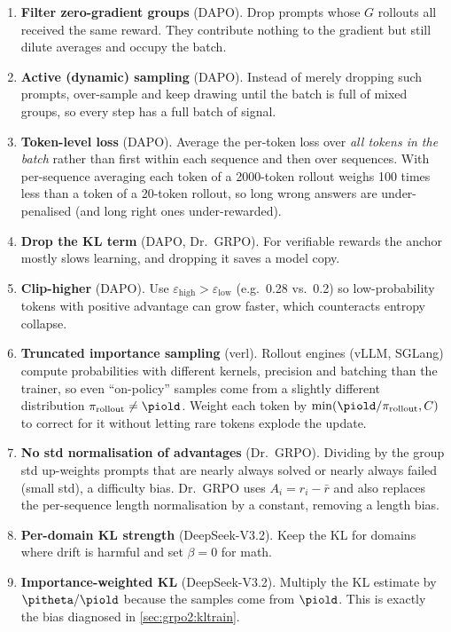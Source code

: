 \begin{enumerate}
\item \textbf{Filter zero-gradient groups} (DAPO). Drop prompts whose $G$ rollouts all
received the same reward. They contribute nothing to the gradient but still dilute averages
and occupy the batch.
\item \textbf{Active (dynamic) sampling} (DAPO). Instead of merely dropping such prompts,
over-sample and keep drawing until the batch is full of mixed groups, so every step has a
full batch of signal.
\item \textbf{Token-level loss} (DAPO). Average the per-token loss over \emph{all tokens in
the batch} rather than first within each sequence and then over sequences. With per-sequence
averaging each token of a 2000-token rollout weighs 100 times less than a token of a 20-token
rollout, so long wrong answers are under-penalised (and long right ones under-rewarded).
\item \textbf{Drop the KL term} (DAPO, Dr.~GRPO). For verifiable rewards the anchor mostly
slows learning, and dropping it saves a model copy.
\item \textbf{Clip-higher} (DAPO). Use $\varepsilon_{\text{high}}>\varepsilon_{\text{low}}$
(e.g.\ 0.28 vs.\ 0.2) so low-probability tokens with positive advantage can grow faster,
which counteracts entropy collapse.
\item \textbf{Truncated importance sampling} (verl). Rollout engines (vLLM, SGLang) compute
probabilities with different kernels, precision and batching than the trainer, so even ``on-policy''
samples come from a slightly different distribution $\pi_{\text{rollout}}\neq\piold$. Weight
each token by $\min(\piold/\pi_{\text{rollout}},C)$ to correct for it without letting rare
tokens explode the update.
\item \textbf{No std normalisation of advantages} (Dr.~GRPO). Dividing by the group std
up-weights prompts that are nearly always solved or nearly always failed (small std), a
difficulty bias. Dr.~GRPO uses $A_i=r_i-\bar r$ and also replaces the per-sequence length
normalisation by a constant, removing a length bias.
\item \textbf{Per-domain KL strength} (DeepSeek-V3.2). Keep the KL for domains where drift is
harmful and set $\beta=0$ for math.
\item \textbf{Importance-weighted KL} (DeepSeek-V3.2). Multiply the KL estimate by
$\pitheta/\piold$ because the samples come from $\piold$. This is exactly the bias diagnosed in
\cref{sec:grpo2:kltrain}.

\end{enumerate}
